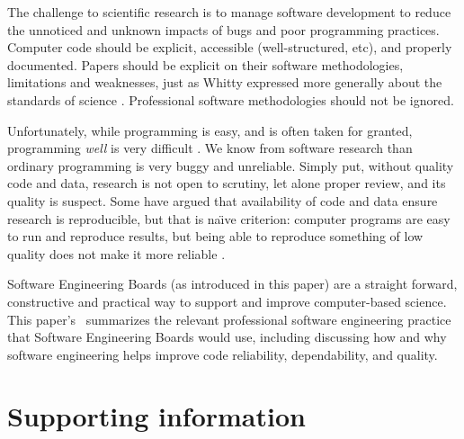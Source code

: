 The challenge to scientific research is to manage software development to reduce the unnoticed and unknown impacts of bugs and poor programming practices. Computer code should be explicit, accessible (well-structured, etc), and properly documented. Papers should be explicit on their software methodologies, limitations and weaknesses, just as Whitty expressed more generally about the standards of science \cite{whitty}. Professional software methodologies should not be ignored.

Unfortunately, while programming is easy, and is often taken for granted, programming \emph{well\/} is very difficult \cite{fixit}. We know from software research than ordinary programming is very buggy and unreliable. Simply put, without quality code and data, research is not open to scrutiny, let alone proper review, and its quality is suspect. Some have argued that availability of code and data ensure research is reproducible, but that is na\"\i ve criterion:  computer programs are easy to run and reproduce results, but being able to reproduce something of low quality does not make it more reliable \cite{reproducibility,relit,popper}. 

Software Engineering Boards (as introduced in this paper) are a straight forward, constructive and practical way to support and improve computer-based science. This paper's \supplement\ summarizes the relevant professional software engineering practice that Software Engineering Boards would use, including discussing how and why software engineering helps improve code reliability, dependability, and quality.

\section*{Supporting information}
\newcount\csrefcount {}
\def\csref{\global\advance\csrefcount by 1}
\def\ethics#1{\paragraph*{Ethics}#1}
\def\ack#1{\paragraph*{Acknowledgments}#1}
\def\dataaccess#1{\paragraph*{Data and code access}#1}
\def\aucontribute#1{\paragraph*{Author contribution}#1}
\def\competing#1{\paragraph*{Competing interests}#1}
\def\funding#1{\paragraph*{Funding}#1}

